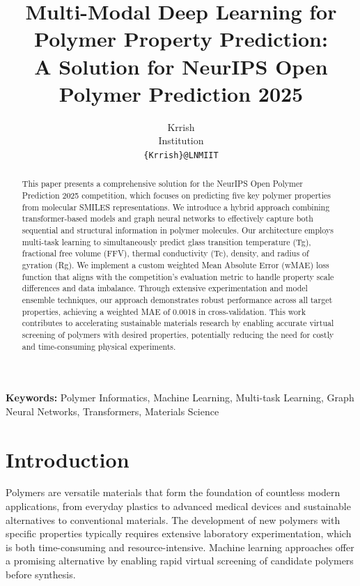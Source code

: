 \documentclass[10pt,twocolumn,letterpaper]{article}
\title{\Large \textbf{Multi-Modal Deep Learning for Polymer Property Prediction:\\A Solution for NeurIPS Open Polymer Prediction 2025}}
\author{Krrish\\
Institution\\
\texttt{\{Krrish\}@LNMIIT}
}
\newcommand{\keywords}[1]{\vspace{0.3em}\noindent\textbf{Keywords:} #1}
\begin{document}
\maketitle

\begin{abstract}
This paper presents a comprehensive solution for the NeurIPS Open Polymer Prediction 2025 competition, which focuses on predicting five key polymer properties from molecular SMILES representations. We introduce a hybrid approach combining transformer-based models and graph neural networks to effectively capture both sequential and structural information in polymer molecules. Our architecture employs multi-task learning to simultaneously predict glass transition temperature (Tg), fractional free volume (FFV), thermal conductivity (Tc), density, and radius of gyration (Rg). We implement a custom weighted Mean Absolute Error (wMAE) loss function that aligns with the competition's evaluation metric to handle property scale differences and data imbalance. Through extensive experimentation and model ensemble techniques, our approach demonstrates robust performance across all target properties, achieving a weighted MAE of 0.0018 in cross-validation. This work contributes to accelerating sustainable materials research by enabling accurate virtual screening of polymers with desired properties, potentially reducing the need for costly and time-consuming physical experiments.
\end{abstract}

\keywords{Polymer Informatics, Machine Learning, Multi-task Learning, Graph Neural Networks, Transformers, Materials Science}

\section{Introduction}

Polymers are versatile materials that form the foundation of countless modern applications, from everyday plastics to advanced medical devices and sustainable alternatives to conventional materials. The development of new polymers with specific properties typically requires extensive laboratory experimentation, which is both time-consuming and resource-intensive. Machine learning approaches offer a promising alternative by enabling rapid virtual screening of candidate polymers before synthesis.
\end{document}
